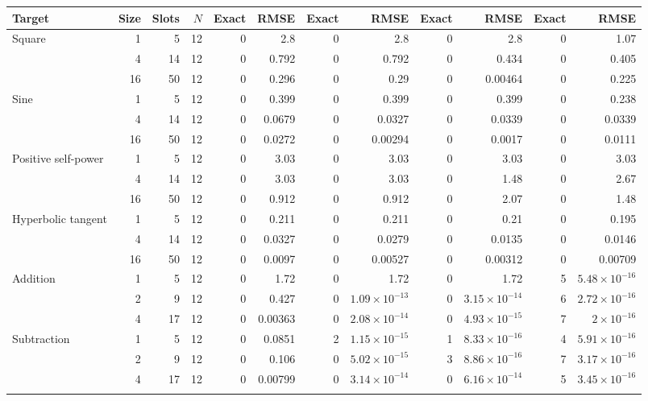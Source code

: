 \begin{table}[htbp]
\begin{tabular*}{\linewidth}{@{\extracolsep{\fill}}lrrr *{4}{rr}@{}}
\cmidrule(lr){5-6}\cmidrule(lr){7-8}\cmidrule(lr){9-10}\cmidrule(l){11-12}
Target & Size & Slots & $N$ & Exact & RMSE & Exact & RMSE & Exact & RMSE & Exact & RMSE \\
\midrule
Square & 1 & 5 & 12 & 0 & 2.8 & 0 & 2.8 & 0 & 2.8 & 0 & 1.07 \\
 & 4 & 14 & 12 & 0 & 0.792 & 0 & 0.792 & 0 & 0.434 & 0 & 0.405 \\
 & 16 & 50 & 12 & 0 & 0.296 & 0 & 0.29 & 0 & 0.00464 & 0 & 0.225 \\
\addlinespace[0.7pt]
Sine & 1 & 5 & 12 & 0 & 0.399 & 0 & 0.399 & 0 & 0.399 & 0 & 0.238 \\
 & 4 & 14 & 12 & 0 & 0.0679 & 0 & 0.0327 & 0 & 0.0339 & 0 & 0.0339 \\
 & 16 & 50 & 12 & 0 & 0.0272 & 0 & 0.00294 & 0 & 0.0017 & 0 & 0.0111 \\
\addlinespace[0.7pt]
Positive self-power & 1 & 5 & 12 & 0 & 3.03 & 0 & 3.03 & 0 & 3.03 & 0 & 3.03 \\
 & 4 & 14 & 12 & 0 & 3.03 & 0 & 3.03 & 0 & 1.48 & 0 & 2.67 \\
 & 16 & 50 & 12 & 0 & 0.912 & 0 & 0.912 & 0 & 2.07 & 0 & 1.48 \\
\addlinespace[0.7pt]
Hyperbolic tangent & 1 & 5 & 12 & 0 & 0.211 & 0 & 0.211 & 0 & 0.21 & 0 & 0.195 \\
 & 4 & 14 & 12 & 0 & 0.0327 & 0 & 0.0279 & 0 & 0.0135 & 0 & 0.0146 \\
 & 16 & 50 & 12 & 0 & 0.0097 & 0 & 0.00527 & 0 & 0.00312 & 0 & 0.00709 \\
\addlinespace[0.7pt]
Addition & 1 & 5 & 12 & 0 & 1.72 & 0 & 1.72 & 0 & 1.72 & 5 & $5.48\!\times\!10^{-16}$ \\
 & 2 & 9 & 12 & 0 & 0.427 & 0 & $1.09\!\times\!10^{-13}$ & 0 & $3.15\!\times\!10^{-14}$ & 6 & $2.72\!\times\!10^{-16}$ \\
 & 4 & 17 & 12 & 0 & 0.00363 & 0 & $2.08\!\times\!10^{-14}$ & 0 & $4.93\!\times\!10^{-15}$ & 7 & $2\!\times\!10^{-16}$ \\
\addlinespace[0.7pt]
Subtraction & 1 & 5 & 12 & 0 & 0.0851 & 2 & $1.15\!\times\!10^{-15}$ & 1 & $8.33\!\times\!10^{-16}$ & 4 & $5.91\!\times\!10^{-16}$ \\
 & 2 & 9 & 12 & 0 & 0.106 & 0 & $5.02\!\times\!10^{-15}$ & 3 & $8.86\!\times\!10^{-16}$ & 7 & $3.17\!\times\!10^{-16}$ \\
 & 4 & 17 & 12 & 0 & 0.00799 & 0 & $3.14\!\times\!10^{-14}$ & 0 & $6.16\!\times\!10^{-14}$ & 5 & $3.45\!\times\!10^{-16}$ \\
\addlinespace[0.7pt]

\end{tabular*}
\end{table}
